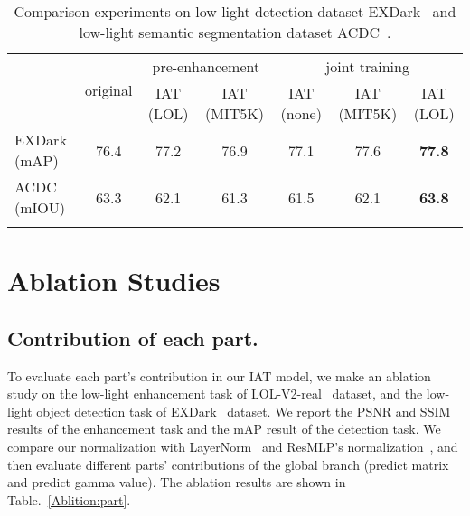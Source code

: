 \documentclass{bmvc2k}
\begin{document}
\begin{table}[t]
\caption{Comparison experiments on low-light detection dataset EXDark~\cite{EXDark} and low-light semantic segmentation dataset ACDC~\cite{ACDC}.}
\centering
\begin{adjustbox}{max width = 0.95\linewidth}
\begin{tabular}{l|c|cc|ccc}
\Xhline{1.0pt}
\multirow{2}{*}{} & \multirow{2}{*}{original} & \multicolumn{2}{c|}{pre-enhancement} & \multicolumn{3}{c}{joint training}   \\ \cline{3-7} 
                  &                           & IAT (LOL)        & IAT (MIT5K)       & IAT (none) & IAT (MIT5K) & IAT (LOL) \\ \Xhline{0.6pt}
EXDark (mAP)      & 76.4                      & 77.2             & 76.9              & 77.1       & 77.6        & \textbf{77.8}     \\ \hline
ACDC (mIOU)       & 63.3                      & 62.1             & 61.3              & 61.5       &   62.1   &    \textbf{63.8}   \\ \Xhline{1.0pt}
\end{tabular}
\end{adjustbox}
\label{Tab:Comparision_high}
\vspace{-3mm}
\end{table}


\section{Ablation Studies}
\vspace{-3mm}
\noindent
\subsection{Contribution of each part.}
To evaluate each part's contribution in our IAT model, we make an ablation study on the low-light enhancement task of LOL-V2-real~\cite{LOL_dataset} dataset, and the low-light object detection task of EXDark~\cite{EXDark} dataset. We report the PSNR and SSIM results of the enhancement task and the mAP result of the detection task. We compare our normalization with LayerNorm~\cite{ln} and ResMLP's normalization~\cite{touvron2021resmlp}, and then evaluate different parts' contributions of the global branch (predict matrix and predict gamma value). The ablation results are shown in Table.~\ref{Ablition:part}. 
\end{document}
